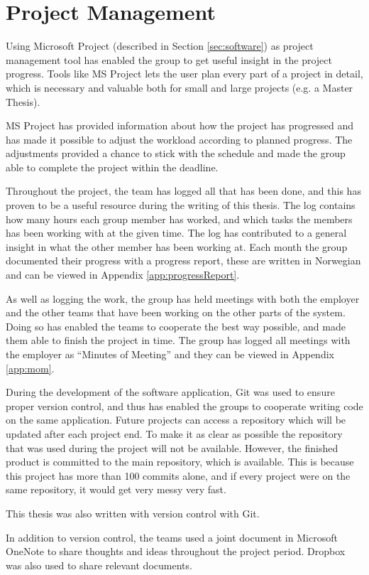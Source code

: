 \chapter{Project Management}
\label{cha:projectmanagement}
Using Microsoft Project (described in Section \ref{sec:software}) as project management tool has enabled the group to get useful insight in the project progress. Tools like MS Project lets the user plan every part of a project in detail, which is necessary and valuable both for small and large projects (e.g. a Master Thesis).

MS Project has provided information about how the project has progressed and has made it possible to adjust the workload according to planned progress. The adjustments provided a chance to stick with the schedule and made the group able to complete the project within the deadline.

Throughout the project, the team has logged all that has been done, and this has proven to be a useful resource during the writing of this thesis. The log contains how many hours each group member has worked, and which tasks the members has been working with at the given time. The log has contributed to a general insight in what the other member has been working at. Each month the group documented their progress with a progress report, these are written in Norwegian and can be viewed in Appendix \ref{app:progressReport}.

As well as logging the work, the group has held meetings with both the employer and the other teams that have been working on the other parts of the system. Doing so has enabled the teams to cooperate the best way possible, and made them able to finish the project in time. The group has logged all meetings with the employer as ``Minutes of Meeting'' and they can be viewed in Appendix \ref{app:mom}.

During the development of the software application, Git was used to ensure proper version control, and thus has enabled the groups to cooperate writing code on the same application. Future projects can access a repository which will be updated after each project end. To make it as clear as possible the repository that was used during the project will not be available. However, the finished product is committed to the main repository, which is available. This is because this project has more than 100 commits alone, and if every project were on the same repository, it would get very messy very fast.

This thesis was also written with version control with Git.

In addition to version control, the teams used a joint document in Microsoft OneNote to share thoughts and ideas throughout the project period. Dropbox was also used to share relevant documents.